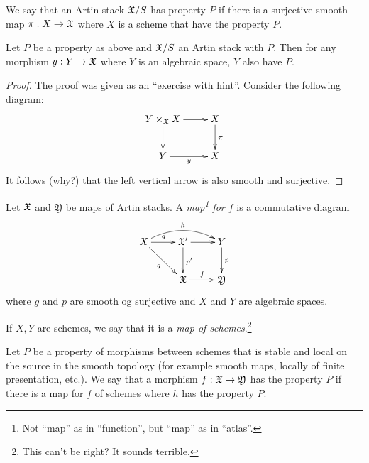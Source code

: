 \documentclass[11pt, english]{article}
\begin{document}
\begin{defi}
We say that an Artin stack $\mathfrak X/S$ has property $P$ if there is a surjective smooth map $\pi: X \to \mathfrak X$ where $X$ is a scheme that have the property $P$.
\end{defi}

\begin{lemma}
Let $P$ be a property as above and $\mathfrak X/S$ an Artin stack with $P$. Then for any morphism $y:Y \to \mathfrak X$ where $Y$ is an algebraic space, $Y$ also have $P$.
\end{lemma}
\begin{proof}
The proof was given as an ``exercise with hint''. Consider the following diagram:
\[
\xymatrix{
Y \times_{\mathfrak X} X \ar[r] \ar[d] & X \ar[d] ^\pi \\
Y \ar[r]_y & X
}
\]
It follows (why?) that the left vertical arrow is also smooth and surjective.
\end{proof}

Let $\mathfrak X$ and $\mathfrak Y$ be maps of Artin stacks. A \emph{map\footnote{Not ``map'' as in ``function'', but ``map'' as in ``atlas''.} for $f$} is a commutative diagram
\begin{equation}
\label{eq:map}
\xymatrix{
X \ar@/^1pc/[rr]^h \ar[r]^g \ar[dr]_q  & \XX^\prime \ar[d]^{p ^\prime}  \ar[r] & Y \ar[d]^p \\
 & \XX \ar[r]^f & \mathfrak Y
} 
\end{equation}
where $g$ and $p$ are smooth og surjective and $X$ and $Y$ are algebraic spaces.

If $X,Y$ are schemes, we say that it is a \emph{map of schemes}.\footnote{This can't be right? It sounds terrible.}

\begin{defi}
Let $P$ be a property of morphisms between schemes that is stable and local on the source in the smooth topology (for example smooth maps, locally of finite presentation, etc.). We say that a morphism $f:\mathfrak X \to \mathfrak Y$ has the property $P$ if there is a map for $f$ of schemes where $h$ has the property $P$.
\end{defi}
\end{document}
